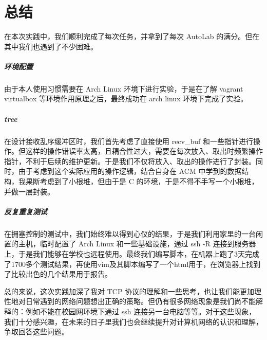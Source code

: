 \chapter{总结}

在本次实践中，我们顺利完成了每次任务，并拿到了每次 AutoLab 的满分。但在其中我们也遇到了不少困难。

\paragraph*{环境配置} 由于本人使用习惯需要在 Arch Linux 环境下进行实验，于是在了解 vagrant virtualbox 等环境作用原理之后，最终成功在 arch linux 环境下完成了实验。

\paragraph*{tree} 在设计接收乱序缓冲区时，我们首先考虑了直接使用 recv\_buf 和一些指针进行操作。但这样的操作错误率太高，且耦合性过大，需要在每次放入、取出时频繁操作指针，不利于后续的维护更新。于是我们不仅将放入、取出的操作进行了封装。同时，由于考虑到这个实际应用的操作逻辑，结合自身在 ACM 中学到的数据结构，我果断考虑到了小根堆，但由于是 C 的环境，于是不得不手写一个小根堆，并做一层封装。

\paragraph*{反复重复测试} 在拥塞控制的测试中，我们始终难以得到心仪的结果，于是我们利用家里的一台闲置的主机，临时配置了 Arch Linux 和一些基础设施，通过 ssh -R 连接到服务器上，于是我们能够在学校也远程使用。最终我们编写脚本，在机器上跑了3天完成了1700多个测试结果，再使用vim及其脚本编写了一个html用于，在浏览器上找到了比较出色的几个结果用于报告。

总的来说，这次实践加深了我对 TCP 协议的理解和一些思考，也让我们能更加理性地对日常遇到的网络问题想出正确的策略。但仍有很多网络现象是我们尚不能解释的：例如不能在校园网环境下通过 ssh 连接另一台电脑等等。对于这些现象，我们十分感兴趣，在未来的日子里我们也会继续提升对计算机网络的认识和理解，争取回答这些问题。
